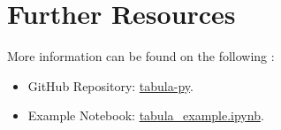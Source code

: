 \section{Further Resources}

More information can be found on the following \cite{Ariga:2024}: 
\begin{itemize}
    \item GitHub Repository: \href{https://github.com/chezou/tabula-py}{tabula-py}.
    \item Example Notebook: \href{https://nbviewer.org/github/chezou/tabula-py/blob/master/examples/tabula\_example.ipynb}{tabula\_example.ipynb}.
\end{itemize}